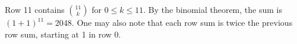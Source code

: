Row 11 contains $\binom{11}{k}$ for $0\le k\le11$. By the binomial theorem, the sum is $(1+1)^{11}=\boxed{2048}$. One may also note that each row sum is twice the previous row sum, starting at 1 in row 0.

